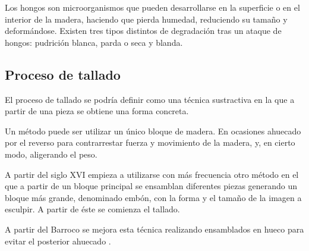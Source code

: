 Los hongos son microorganismos que pueden desarrollarse en la superficie o en el interior de la madera, haciendo que pierda humedad, reduciendo su tamaño y deformándose. Existen tres tipos distintos de degradación tras un ataque de hongos: pudrición blanca, parda o seca y blanda.

\subsection{Proceso de tallado}

El proceso de tallado se podría definir como una técnica sustractiva en la que a partir de una pieza se obtiene una forma concreta.

Un método puede ser utilizar un único bloque de madera. En ocasiones ahuecado por el reverso para contrarrestar fuerza y movimiento de la madera, y, en cierto modo, aligerando el peso.

A partir del siglo XVI empieza a utilizarse con más frecuencia otro método en el que a partir de un bloque principal se ensamblan diferentes piezas generando un bloque más grande, denominado embón, con la forma y el tamaño de la imagen a esculpir. A partir de éste se comienza el tallado.

A partir del Barroco se mejora esta técnica realizando ensamblados en hueco para evitar el posterior ahuecado \cite{tc-esculturas}.



